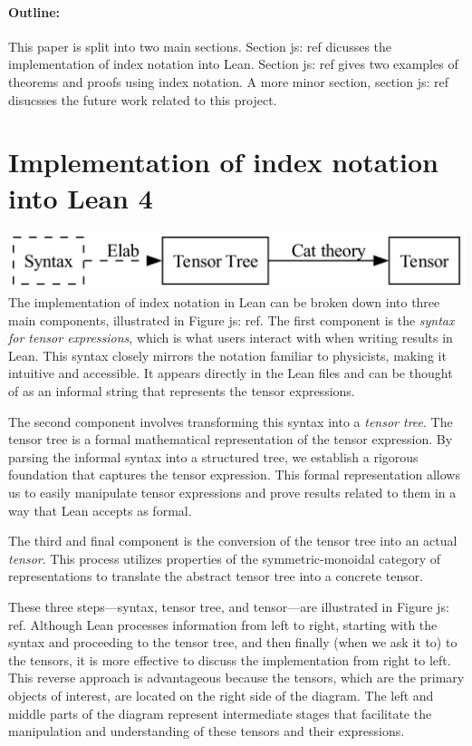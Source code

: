 \documentclass[a4paper, 11pt]{article}
\newcommand{\js}[1]{ {\color{magenta} js:  #1}}
\begin{document}
\paragraph{Outline:} This paper is split into two main sections. Section \js{ref} dicusses 
the implementation of index notation into Lean. Section \js{ref} gives two examples 
of theorems and proofs using index notation. A more minor section, section \js{ref} disucsses 
the future work related to this project.


\section{Implementation of index notation into Lean 4}
\includegraphics[width=\textwidth]{overviewFlow.png}
The implementation of index notation in Lean can be  broken down into 
three main components, illustrated in Figure \js{ref}. 
The first component is the \emph{syntax for tensor expressions}, 
which is what users interact with when writing results in Lean. 
This syntax closely mirrors the notation familiar to physicists, 
making it intuitive and accessible. 
It appears directly in the Lean files and can be thought of as an informal string 
that represents the tensor expressions.

The second component involves transforming this syntax into a \emph{tensor tree}. 
The tensor tree is a formal mathematical representation of the tensor expression. 
By parsing the informal syntax into a structured tree, 
we establish a rigorous foundation that captures the tensor expression. 
This formal representation allows us to easily manipulate tensor expressions and
prove results related to them in a way that Lean accepts as formal.

The third and final component is the conversion of the tensor tree into an actual \emph{tensor}. 
This process utilizes properties of the symmetric-monoidal category of representations
 to translate the abstract tensor tree into a concrete tensor.

These three steps—syntax, tensor tree, and tensor—are illustrated in Figure \js{ref}. 
Although Lean processes information from left to right, 
starting with the syntax and proceeding to the tensor tree, and then finally (when 
we ask it to) to the tensors, 
it is more effective to discuss the implementation from right to left. 
This reverse approach is advantageous because the tensors,
 which are the primary objects of interest, are located on the right side of the diagram. 
 The left and middle parts of the diagram represent intermediate stages that facilitate the 
 manipulation and understanding of these tensors and their expressions.
\end{document}
